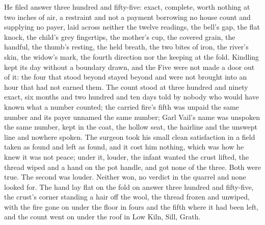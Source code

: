 He filed answer three hundred and fifty-five: exact, complete, worth nothing at two inches of air, a restraint and not a payment borrowing no house count and supplying no payer, laid across neither the twelve readings, the bell's gap, the flat knock, the child's grey fingertips, the mother's cup, the covered grain, the handful, the thumb's resting, the held breath, the two bites of iron, the river's skin, the widow's mark, the fourth direction nor the keeping at the fold. Kindling kept its day without a boundary drawn, and the Five were not made a door out of it: the four that stood beyond stayed beyond and were not brought into an hour that had not earned them. The count stood at three hundred and ninety exact, six months and two hundred and ten days told by nobody who would have known what a number counted; the carried fire's fifth was unpaid the same number and its payer unnamed the same number; Garl Vail's name was unspoken the same number, kept in the coat, the hollow seat, the hairline and the unswept line and nowhere spoken. The surgeon took his small clean satisfaction in a field taken as found and left as found, and it cost him nothing, which was how he knew it was not peace; under it, louder, the infant wanted the crust lifted, the thread wiped and a hand on the pot handle, and got none of the three. Both were true. The second was louder. Neither won, no verdict in the quarrel and none looked for. The hand lay flat on the fold on answer three hundred and fifty-five, the crust's corner standing a hair off the wool, the thread frozen and unwiped, with the fire gone on under the floor in fours and the fifth where it had been left, and the count went on under the roof in Low Kiln, Sill, Grath.
